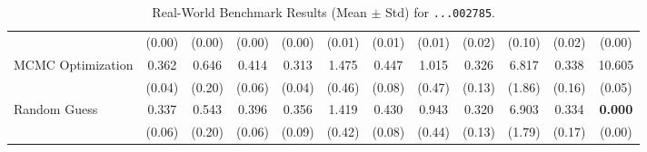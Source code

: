 \begin{table}[ht]
{\begin{tabular}{l cccc cccc cc c}
                                    & (0.00)                                          & (0.00)                                       & (0.00)                                        & (0.00)                  & (0.01)            & (0.01)          & (0.01)          & (0.02)            & (0.10)           & (0.02)           & (0.00)              \\
            \addlinespace[0.2em]
            MCMC Optimization       & 0.362                                           & 0.646                                        & 0.414                                         & 0.313                   & 1.475             & 0.447           & 1.015           & 0.326             & 6.817            & 0.338            & 10.605              \\
                                    & (0.04)                                          & (0.20)                                       & (0.06)                                        & (0.04)                  & (0.46)            & (0.08)          & (0.47)          & (0.13)            & (1.86)           & (0.16)           & (0.05)              \\
            \addlinespace[0.2em]
            Random Guess            & 0.337                                           & 0.543                                        & 0.396                                         & 0.356                   & 1.419             & 0.430           & 0.943           & 0.320             & 6.903            & 0.334            & \textbf{0.000     } \\
                                    & (0.06)                                          & (0.20)                                       & (0.06)                                        & (0.09)                  & (0.42)            & (0.08)          & (0.44)          & (0.13)            & (1.79)           & (0.17)           & (0.00)              \\
            \bottomrule
        \end{tabular}%
    }
    \caption{Real-World Benchmark Results (Mean $\pm$ Std) for \texttt{...002785}.}
    \label{tab:real_world_results3}

\end{table}